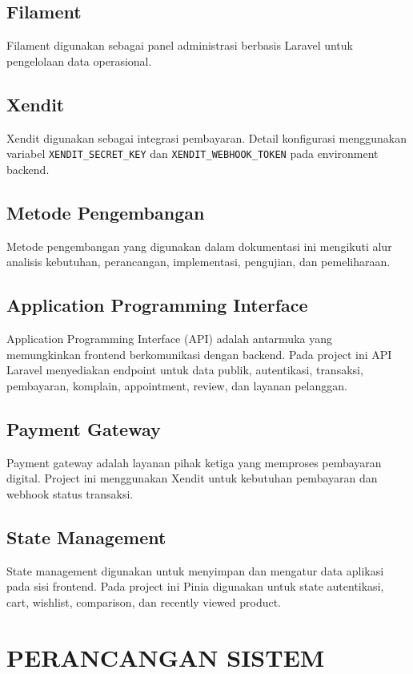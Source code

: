\documentclass[12pt,a4paper]{report}
\begin{document}
\section{Filament}
Filament digunakan sebagai panel administrasi berbasis Laravel untuk pengelolaan data operasional.

\section{Xendit}
Xendit digunakan sebagai integrasi pembayaran. Detail konfigurasi menggunakan variabel \texttt{XENDIT\_SECRET\_KEY} dan \texttt{XENDIT\_WEBHOOK\_TOKEN} pada environment backend.

\section{Metode Pengembangan}
Metode pengembangan yang digunakan dalam dokumentasi ini mengikuti alur analisis kebutuhan, perancangan, implementasi, pengujian, dan pemeliharaan.

\section{Application Programming Interface}
Application Programming Interface (API) adalah antarmuka yang memungkinkan frontend berkomunikasi dengan backend. Pada project ini API Laravel menyediakan endpoint untuk data publik, autentikasi, transaksi, pembayaran, komplain, appointment, review, dan layanan pelanggan.

\section{Payment Gateway}
Payment gateway adalah layanan pihak ketiga yang memproses pembayaran digital. Project ini menggunakan Xendit untuk kebutuhan pembayaran dan webhook status transaksi.

\section{State Management}
State management digunakan untuk menyimpan dan mengatur data aplikasi pada sisi frontend. Pada project ini Pinia digunakan untuk state autentikasi, cart, wishlist, comparison, dan recently viewed product.

\chapter{PERANCANGAN SISTEM}
\end{document}
